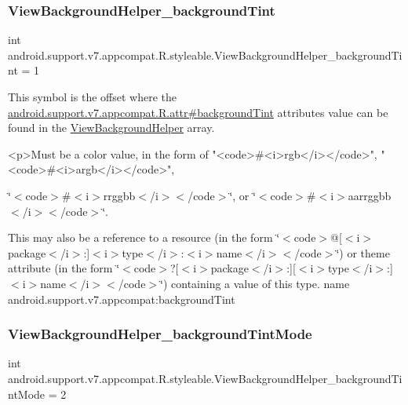 \subsubsection{\texorpdfstring{View\+Background\+Helper\+\_\+background\+Tint}{ViewBackgroundHelper\_backgroundTint}}
{\footnotesize\ttfamily int android.\+support.\+v7.\+appcompat.\+R.\+styleable.\+View\+Background\+Helper\+\_\+background\+Tint = 1\hspace{0.3cm}{\ttfamily [static]}}

This symbol is the offset where the \hyperlink{classandroid_1_1support_1_1v7_1_1appcompat_1_1R_1_1attr_a6bf6c479f7c0fccd735ef4b8cd293ceb}{android.\+support.\+v7.\+appcompat.\+R.\+attr\#background\+Tint} attribute\textquotesingle{}s value can be found in the \hyperlink{classandroid_1_1support_1_1v7_1_1appcompat_1_1R_1_1styleable_a41b23c720259f27b563271bda1b5767a}{View\+Background\+Helper} array.

\begin{DoxyVerb}      <p>Must be a color value, in the form of "<code>#<i>rgb</i></code>", "<code>#<i>argb</i></code>",
\end{DoxyVerb}
 \char`\"{}$<$code$>$\#$<$i$>$rrggbb$<$/i$>$$<$/code$>$\char`\"{}, or \char`\"{}$<$code$>$\#$<$i$>$aarrggbb$<$/i$>$$<$/code$>$\char`\"{}. 

This may also be a reference to a resource (in the form \char`\"{}$<$code$>$@\mbox{[}$<$i$>$package$<$/i$>$\+:\mbox{]}$<$i$>$type$<$/i$>$\+:$<$i$>$name$<$/i$>$$<$/code$>$\char`\"{}) or theme attribute (in the form \char`\"{}$<$code$>$?\mbox{[}$<$i$>$package$<$/i$>$\+:\mbox{]}\mbox{[}$<$i$>$type$<$/i$>$\+:\mbox{]}$<$i$>$name$<$/i$>$$<$/code$>$\char`\"{}) containing a value of this type.  name android.\+support.\+v7.\+appcompat\+:background\+Tint \mbox{\label{classandroid_1_1support_1_1v7_1_1appcompat_1_1R_1_1styleable_ae71c6f8dbad2f486dc512dcaaada8083}} 
\subsubsection{\texorpdfstring{View\+Background\+Helper\+\_\+background\+Tint\+Mode}{ViewBackgroundHelper\_backgroundTintMode}}
{\footnotesize\ttfamily int android.\+support.\+v7.\+appcompat.\+R.\+styleable.\+View\+Background\+Helper\+\_\+background\+Tint\+Mode = 2\hspace{0.3cm}{\ttfamily [static]}}

